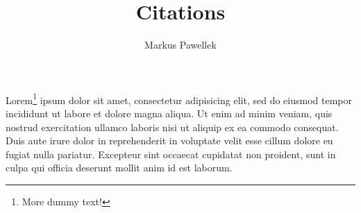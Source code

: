\documentclass{article}
\title{Citations}
\author{Markus Pawellek}
\begin{document}
  \maketitle

  Lorem\footnote{More dummy text!} ipsum dolor sit amet, consectetur adipisicing elit, sed do eiusmod
  tempor incididunt ut labore et dolore magna aliqua. Ut enim ad minim veniam,
  quis nostrud exercitation ullamco laboris nisi ut aliquip ex ea commodo
  consequat. Duis aute irure dolor in reprehenderit in voluptate velit esse
  cillum dolore eu fugiat nulla pariatur. Excepteur sint occaecat cupidatat non
  proident, sunt in culpa qui officia deserunt mollit anim id est laborum.
  \cite[p.~49]{Schweizer2013}


  \nocite{*}
  {}
  
\end{document}
